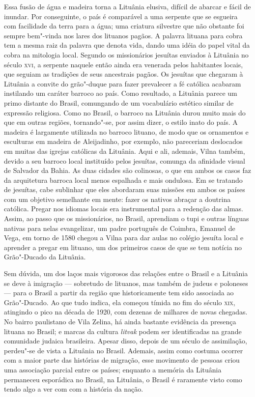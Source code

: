 Essa fusão de água e madeira torna a Lituânia elusiva, difícil de
abarcar e fácil de inundar. Por conseguinte, o país é comparável a uma
serpente que se esgueira com facilidade da terra para a água; uma
criatura silvestre que não obstante foi sempre bem"-vinda nos lares dos
lituanos pagãos. A palavra lituana para cobra tem a mesma raiz da
palavra que denota vida, dando uma idéia do papel vital da cobra na
mitologia local. Segundo os missionários jesuítas enviados à Lituânia no
século \textsc{xvi}, a serpente naquele então ainda era venerada pelos
habitantes locais, que seguiam as tradições de seus ancestrais pagãos.
Os jesuítas que chegaram à Lituânia a convite do grão"-duque para fazer
prevalecer a fé católica acabaram instilando um caráter barroco ao país.
Como resultado, a Lituânia parece um primo distante do Brasil,
comungando de um vocabulário estético similar de expressão religiosa.
Como no Brasil, o barroco na Lituânia durou muito mais do que em outras
regiões, tornando"-se, por assim dizer, o estilo inato do país. A madeira
é largamente utilizada no barroco lituano, de modo que os ornamentos e
esculturas em madeira de Aleijadinho, por exemplo, não pareceriam
deslocados em muitas das igrejas católicas da Lituânia. Aqui e ali,
ademais, Vilna também, devido a seu barroco local instituído pelos
jesuítas, comunga da afinidade visual de Salvador da Bahia. As duas
cidades são colinosas, o que em ambos os casos faz da arquitetura
barroca local menos espalhada e mais ondulosa. Em se tratando de
jesuítas, cabe sublinhar que eles abordaram suas missões em ambos os
países com um objetivo semelhante em mente: fazer os nativos abraçar a
doutrina católica. Pregar nos idiomas locais era instrumental para a
redenção das almas. Assim, ao passo que os missionários, no Brasil,
aprendiam o tupi e outras línguas nativas para nelas evangelizar, um
padre português de Coimbra, Emanuel de Vega, em torno de 1580 chegou a
Vilna para dar aulas no colégio jesuíta local e aprender a pregar em
lituano, um dos primeiros casos de que se tem notícia no Grão"-Ducado da
Lituânia.

Sem dúvida, um dos laços mais vigorosos das relações entre o Brasil e a
Lituânia se deve à imigração --- sobretudo de lituanos, mas também de
judeus e poloneses --- para o Brasil a partir da região que historicamente
tem sido associada ao Grão"-Ducado. Ao que tudo indica, ela começou
tímida no fim do século \textsc{xix}, atingindo o pico na década de 1920,
com dezenas de milhares de novas chegadas. No bairro paulistano de Vila
Zelina, há ainda bastante evidência da presença lituana no Brasil; e
marcas da cultura \textit{litvak} podem ser identificadas na grande comunidade
judaica brasileira. Apesar disso, depois de um século de assimilação,
perdeu"-se de vista a Lituânia no Brasil. Ademais, assim como costuma
ocorrer com a maior parte das histórias de migração, esse movimento de
pessoas criou uma associação parcial entre os países; enquanto a memória
da Lituânia permaneceu esporádica no Brasil, na Lituânia, o Brasil é
raramente visto como tendo algo a ver com com a história da nação.

